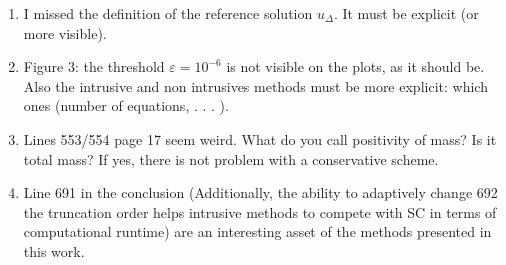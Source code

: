 \documentclass[11pt]{amsart}
\begin{document}
\begin{enumerate}
\item I missed the definition of the reference solution $u_{\Delta}$. It must be explicit
(or more visible).
\item Figure 3: the threshold $\varepsilon = 10^{-6}$ is not visible on the plots, as it should
be. Also the intrusive and non intrusives methods must be more explicit:
which ones (number of equations, . . . ).
\item Lines 553/554 page 17 seem weird. What do you call positivity of mass?
Is it total mass? If yes, there is not problem with a conservative scheme.
\item Line 691 in the conclusion (Additionally, the ability to adaptively change
692 the truncation order helps intrusive methods to compete with SC in
terms of computational runtime) are an interesting asset of the methods
presented in this work.
\end{enumerate}
\end{document}
